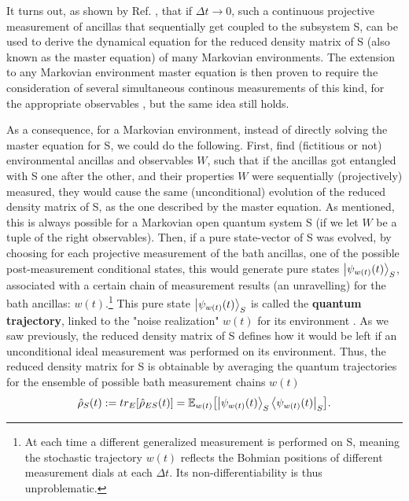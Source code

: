 \documentclass[11pt, a4paper]{article} %
\begin{document}
It turns out, as shown by Ref. \cite{continousMeas}, that if $\Delta t\rightarrow 0$, such a continuous projective measurement of ancillas that sequentially get coupled to the subsystem S, can be used to derive the dynamical equation for the reduced density matrix of S (also known as the master equation) of many Markovian environments. The extension to any Markovian environment master equation is then proven to require the consideration of several simultaneous continous measurements of this kind, for the appropriate observables \cite{continousMeas, MarkovianityDefs}, but the same idea still holds.

As a consequence, for a Markovian environment, instead of directly solving the master equation for S, we could do the following. First, find (fictitious or not) environmental ancillas and observables $W$, such that if the ancillas got entangled with S one after the other, and their properties $W$ were sequentially (projectively) measured, they would cause the same (unconditional) evolution of the reduced density matrix of S, as the one described by the master equation. As mentioned, this is always possible for a Markovian open quantum system S (if we let $W$ be a tuple of the right observables). Then, if a pure state-vector of S was evolved, by choosing for each projective measurement of the bath ancillas, one of the possible post-measurement conditional states, this would generate pure states $\ket{\psi_{w(t)}(t)}_S$, associated with a certain chain of measurement results (an unravelling) for the bath ancillas: $w(t)$.\footnote{At each time a different generalized measurement is performed on S, meaning the stochastic trajectory $w(t)$ reflects the Bohmian positions of different measurement dials at each $\Delta t$. Its non-differentiability is thus unproblematic.} This pure state $\ket{\psi_{w(t)}(t)}_S$ is called the {\bf quantum trajectory}, linked to the "noise realization" $w(t)$ for its environment \cite{Generalized, MarkovianityDefs, QuantumTrajs}. As we saw previously, the reduced density matrix of S defines how it would be left if an unconditional ideal measurement was performed on its environment. Thus, the reduced density matrix for S is obtainable by averaging the quantum trajectories for the ensemble of possible bath measurement chains $w(t)$ \cite{MarkovianityDefs,QuantumTrajs}\vspace{-0.17cm}
\begin{equation}
\hat{\rho}_S(t):=tr_{E}[\hat{\rho}_{ES}(t)]=\mathbb{E}_{w(t)}\qty[\ket{\psi_{w(t)}(t)}_S\bra{\psi_{w(t)}(t)}_S]. \vspace{-0.07cm}
\end{equation}
\end{document}
